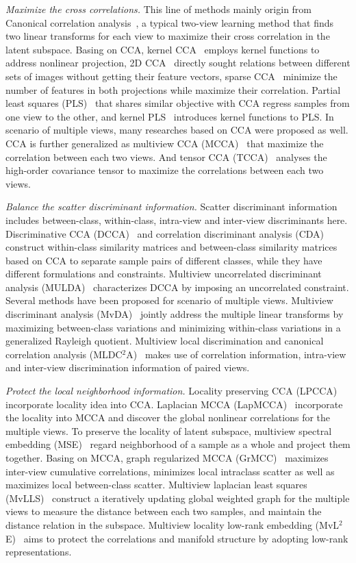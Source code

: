 \documentclass[journal]{IEEEtran}
\begin{document}
\textit{Maximize the cross correlations.}
This line of methods mainly origin from Canonical correlation analysis~\cite{CCA}, 
a typical two-view learning method that finds two linear transforms for each view to maximize their cross correlation in the latent subspace. 
Basing on CCA, kernel CCA~\cite{KCCA} employs kernel functions to address nonlinear projection, 
2D CCA~\cite{2D-CCA} directly sought relations between different sets of images without getting their feature vectors, 
sparse CCA~\cite{Sparse-CCA} minimize the number of features in both projections while maximize their correlation. 
Partial least squares (PLS)~\cite{PLS} that shares similar objective with CCA regress samples from one view to the other, and kernel PLS~\cite{KPLS} introduces kernel functions to PLS. 
In scenario of multiple views, many researches based on CCA were proposed as well. 
CCA is further generalized as multiview CCA (MCCA)~\cite{MCCA} that maximize the correlation between each two views. 
And tensor CCA (TCCA)~\cite{TCCA} analyses the high-order covariance tensor to maximize the correlations between each two views. 

\textit{Balance the scatter discriminant information.}
Scatter discriminant information includes between-class, within-class, intra-view and inter-view discriminants here. 
Discriminative CCA (DCCA)~\cite{DCCA} and correlation discriminant analysis (CDA)~\cite{CDA} construct within-class similarity matrices and between-class similarity matrices based on CCA to separate sample pairs of different classes, while they have different formulations and constraints. 
Multiview uncorrelated discriminant analysis (MULDA)~\cite{MULDA} characterizes DCCA by imposing an uncorrelated constraint. 
Several methods have been proposed for scenario of multiple views. 
Multiview discriminant analysis (MvDA)~\cite{MvDA} jointly address the multiple linear transforms by maximizing between-class variations and minimizing within-class variations in a generalized Rayleigh quotient. 
Multiview local discrimination and canonical correlation analysis (MLDC$^2$A)~\cite{MLDC2A} makes use of correlation information, intra-view and inter-view discrimination information of paired views. 

\textit{Protect the local neighborhood information.}
Locality preserving CCA (LPCCA)~\cite{LPCCA} incorporate locality idea into CCA. 
Laplacian MCCA (LapMCCA)~\cite{LapMCCA} incorporate the locality into MCCA and discover the global nonlinear correlations for the multiple views. 
To preserve the locality of latent subspace, multiview spectral embedding (MSE)~\cite{MSE} regard neighborhood of a sample as a whole and project them together. 
Basing on MCCA, graph regularized MCCA (GrMCC)~\cite{GrMCC} maximizes inter-view cumulative correlations, minimizes local intraclass scatter as well as maximizes local between-class scatter. 
Multiview laplacian least squares (MvLLS)~\cite{MvLLS} construct a iteratively updating global weighted graph for the multiple views to measure the distance between each two samples, and maintain the distance relation in the subspace. 
Multiview locality low-rank embedding (MvL$^2$E)~\cite{xiangzhu} aims to protect the correlations and manifold structure by adopting low-rank representations. 
\end{document}
